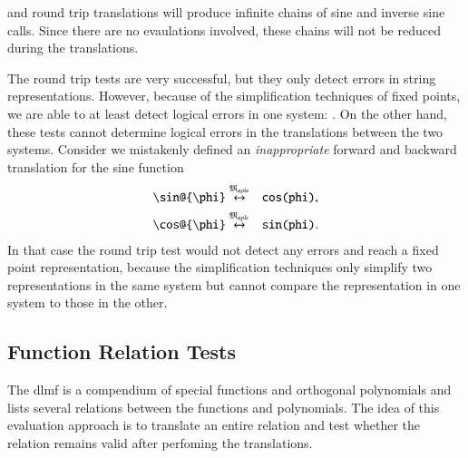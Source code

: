 and round trip translations will produce infinite chains of sine and inverse sine calls. Since there are no evaulations involved, these chains will not be reduced during the translations. %

The round trip tests are very successful, but they only detect errors in string representations. However, because of the simplification techniques of fixed points, we are able to at least detect logical errors in one system: \Maple. On the other hand, these tests cannot determine logical errors in the translations between the two systems. Consider we mistakenly defined an \textit{inappropriate} forward and backward translation for the sine function
\begin{eqnarray}
\verb|\sin@{\phi}| & \overset{\langMaple}{\leftrightarrow} & \verb|cos(phi)|,\label{eq:wrong-trans-1}\\
\verb|\cos@{\phi}| & \overset{\langMaple}{\leftrightarrow} & \verb|sin(phi)|.\label{eq:wrong-trans-2}
\end{eqnarray}
In that case the round trip test would not detect any errors and reach a fixed point representation, because the simplification techniques only simplify two representations in the same system but cannot compare the representation in one system to those in the other.

\subsection{Function Relation Tests}\label{sec:relation-tests}

The \gls*{dlmf} is a compendium of special functions and orthogonal polynomials and lists several relations between the functions and polynomials. The idea of this evaluation approach is to translate an entire relation and test whether the relation remains valid after perfoming the translations.

